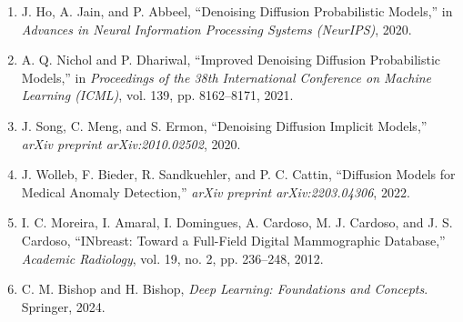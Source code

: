\documentclass[10pt]{article}
\begin{document}
	\begin{enumerate}
		\item J. Ho, A. Jain, and P. Abbeel, ``Denoising Diffusion Probabilistic Models,'' in \textit{Advances in Neural Information Processing Systems (NeurIPS)}, 2020.
		
		\item A. Q. Nichol and P. Dhariwal, ``Improved Denoising Diffusion Probabilistic Models,'' in \textit{Proceedings of the 38th International Conference on Machine Learning (ICML)}, vol. 139, pp. 8162--8171, 2021.
		
		\item J. Song, C. Meng, and S. Ermon, ``Denoising Diffusion Implicit Models,'' \textit{arXiv preprint arXiv:2010.02502}, 2020.
		
		\item J. Wolleb, F. Bieder, R. Sandkuehler, and P. C. Cattin, ``Diffusion Models for Medical Anomaly Detection,'' \textit{arXiv preprint arXiv:2203.04306}, 2022.
		
		\item I. C. Moreira, I. Amaral, I. Domingues, A. Cardoso, M. J. Cardoso, and J. S. Cardoso, ``INbreast: Toward a Full-Field Digital Mammographic Database,'' \textit{Academic Radiology}, vol. 19, no. 2, pp. 236--248, 2012.
		
		\item C. M. Bishop and H. Bishop, \textit{Deep Learning: Foundations and Concepts}. Springer, 2024.
		
	\end{enumerate}
	
\end{document}
